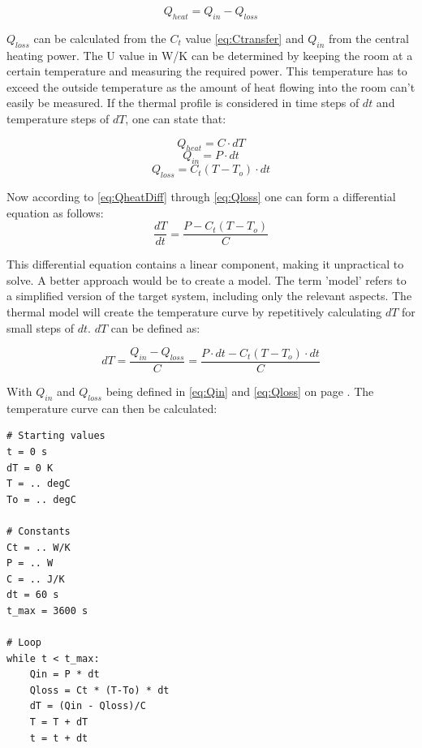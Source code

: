 \documentclass[12pt,a4paper,final]{report}
\begin{document}
\begin{equation} \label{eq:QheatDiff}
Q_{heat} = Q_{in} - Q_{loss}
\end{equation}

$Q_{loss}$ can be calculated from the $C_{t}$ value \eqref{eq:Ctransfer} and $Q_{in}$ from the central heating power. The U value in W/K can be determined by keeping the room at a certain temperature and measuring the required power. This temperature has to exceed the outside temperature as the amount of heat flowing into the room can't easily be measured. If the thermal profile is considered in time steps of $dt$ and temperature steps of $dT$, one can state that:

\begin{equation} \label{eq:Qheat}
Q_{heat} = C\cdot dT
\end{equation}
\begin{equation} \label{eq:Qin}
Q_{in} = P\cdot dt
\end{equation}
\begin{equation} \label{eq:Qloss}
Q_{loss} = C_{t}(T-T_{o})\cdot dt
\end{equation}


Now according to \eqref{eq:QheatDiff} through \eqref{eq:Qloss} one can form a differential equation as follows:
\begin{equation} \label{eq:diffEq}
\frac{dT}{dt} = \frac{P-C_{t}(T-T_{o})}{C}
\end{equation}

This differential equation contains a linear component, making it unpractical to solve. A better approach would be to create a model. The term 'model' refers to a simplified version of the target system, including only the relevant aspects.\cite{ModelsInPhysics} The thermal model will create the temperature curve by repetitively calculating $dT$ for small steps of $dt$. $dT$ can be defined as: 

\begin{equation} \label{eq:dT}
dT = \frac{Q_{in}-Q_{loss}}{C} = \frac{P\cdot dt -C_{t}(T-T_{o})\cdot dt}{C}
\end{equation}

With $Q_{in}$ and $Q_{loss}$ being defined in \eqref{eq:Qin} and \eqref{eq:Qloss} on page \pageref{eq:Qloss}. The temperature curve can then be calculated:
\lstset{language=Python}
\begin{lstlisting}[caption={(pseudocode) calculating the temperature curve},label={lst:tempCurve}]
# Starting values
t = 0 s
dT = 0 K
T = .. degC 
To = .. degC

# Constants
Ct = .. W/K
P = .. W
C = .. J/K
dt = 60 s
t_max = 3600 s

# Loop
while t < t_max:
	Qin = P * dt
	Qloss = Ct * (T-To) * dt
	dT = (Qin - Qloss)/C
	T = T + dT
	t = t + dt
\end{lstlisting}
\end{document}
